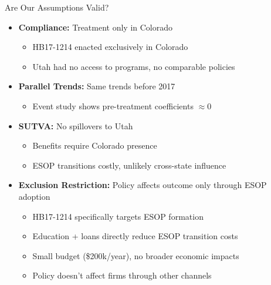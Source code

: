 \documentclass{beamer}
\begin{document}
\begin{frame}{Are Our Assumptions Valid?}

\normalsize

\begin{itemize}
    \item[\textcolor{green!60!black}{$\checkmark$}] \textbf{Compliance:} Treatment only in Colorado
    \begin{itemize}
        \footnotesize
        \item HB17-1214 enacted exclusively in Colorado
        \item Utah had no access to programs, no comparable policies
    \end{itemize}

    \vspace{1em}

    \item[\textcolor{green!60!black}{$\checkmark$}] \textbf{Parallel Trends:} Same trends before 2017
    \begin{itemize}
        \footnotesize
        \item Event study shows pre-treatment coefficients $\approx 0$
    \end{itemize}

    \vspace{1em}

    \item[\textcolor{green!60!black}{$\checkmark$}] \textbf{SUTVA:} No spillovers to Utah
    \begin{itemize}
        \footnotesize
        \item Benefits require Colorado presence
        \item ESOP transitions costly, unlikely cross-state influence
    \end{itemize}

    \vspace{1em}

    \item[\textcolor{green!60!black}{$\checkmark$}] \textbf{Exclusion Restriction:} Policy affects outcome only through ESOP adoption
    \begin{itemize}
        \footnotesize
        \item HB17-1214 specifically targets ESOP formation
        \item Education + loans directly reduce ESOP transition costs
        \item Small budget (\$200k/year), no broader economic impacts
        \item Policy doesn't affect firms through other channels
    \end{itemize}
\end{itemize}

\end{frame}
\end{document}
